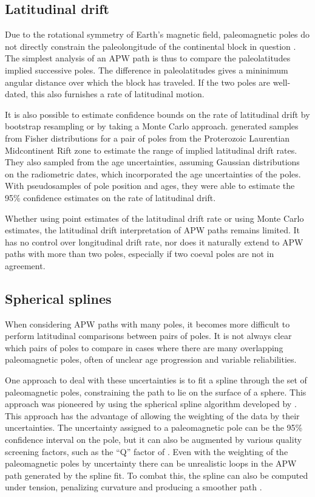 \documentclass[preprint,12pt,authoryear]{elsarticle}
\begin{document}
\subsection{Latitudinal drift}
\label{sec:latitudinal_drift}
Due to the rotational symmetry of Earth's magnetic field, paleomagnetic poles do not
directly constrain the paleolongitude of the continental block in question \citep{butler1992paleomagnetism}.
The simplest analysis of an APW path is thus to compare the paleolatitudes implied successive poles.
The difference in paleolatitudes gives a mininimum angular distance over which the block has traveled. 
If the two poles are well-dated, this also furnishes a rate of latitudinal motion.

It is also possible to estimate confidence bounds on the rate of latitudinal drift by
bootstrap resampling \citep[e.g.][]{tarduno1990fast} or by taking a Monte Carlo approach. 
\citet{swanson2014confirmation} generated samples from Fisher distributions
for a pair of poles from the Proterozoic Laurentian Midcontinent Rift zone to estimate the range
of implied latitudinal drift rates. They also sampled from the age uncertainties, assuming
Gaussian distributions on the radiometric dates, which incorporated the age uncertainties of the poles.
With pseudosamples of pole position and ages, they were able to estimate the 95\% 
confidence estimates on the rate of latitudinal drift.

Whether using point estimates of the latitudinal drift rate or using Monte Carlo estimates, 
the latitudinal drift interpretation of APW paths remains limited.
It has no control over longitudinal drift rate, 
nor does it naturally extend to APW paths with more than two poles, 
especially if two coeval poles are not in agreement.

\subsection{Spherical splines}
\label{sec:spherical_splines}
When considering APW paths with many poles, it becomes more difficult to perform
latitudinal comparisons between pairs of poles. It is not always clear which pairs of
poles to compare in cases where there are many overlapping paleomagnetic poles,
often of unclear age progression and variable reliabilities.

One approach to deal with these uncertainties is to fit a spline through the
set of paleomagnetic poles, constraining the path to lie on the surface of a sphere.
This approach was pioneered by \citet{torsvik1992baltica} using the spherical spline
algorithm developed by \citet{jupp1987fitting}.
This approach has the advantage of allowing the weighting of the data by their
uncertainties. The uncertainty assigned to a paleomagnetic pole can
be the 95\% confidence interval on the pole, but it can also be augmented
by various quality screening factors, such as the ``Q'' factor of \citet{van1990reliability} \citep{torsvik1992baltica}. 
Even with the weighting of the paleomagnetic poles by uncertainty there
can be unrealistic loops in the APW path generated by the spline fit.
To combat this, the spline can also be computed under tension, penalizing
curvature and producing a smoother path \citep{torsvik1996continental}.
\end{document}
